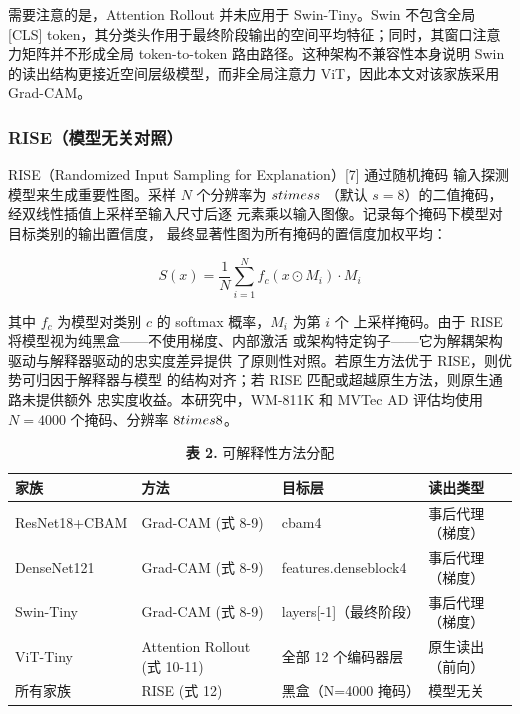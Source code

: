 \documentclass[11pt,a4paper]{article}
\begin{document}
需要注意的是，Attention Rollout 并未应用于 Swin-Tiny。Swin 不包含全局 [CLS] token，其分类头作用于最终阶段输出的空间平均特征；同时，其窗口注意力矩阵并不形成全局 token-to-token 路由路径。这种架构不兼容性本身说明 Swin 的读出结构更接近空间层级模型，而非全局注意力 ViT，因此本文对该家族采用 Grad-CAM。

\subsubsection{RISE（模型无关对照）}

RISE（Randomized Input Sampling for Explanation）[7] 通过随机掩码 输入探测模型来生成重要性图。采样 $N$ 个分辨率为 $s{\\times}s$ （默认 $s{=}8$）的二值掩码，经双线性插值上采样至输入尺寸后逐 元素乘以输入图像。记录每个掩码下模型对目标类别的输出置信度， 最终显著性图为所有掩码的置信度加权平均：

\begin{equation}
S(x) = \frac{1}{N} \sum_{i=1}^{N} f_c(x \odot M_i) \cdot M_i
\tag{12}
\end{equation}

其中 $f_c$ 为模型对类别 $c$ 的 softmax 概率，$M_i$ 为第 $i$ 个 上采样掩码。由于 RISE 将模型视为纯黑盒——不使用梯度、内部激活 或架构特定钩子——它为解耦架构驱动与解释器驱动的忠实度差异提供 了原则性对照。若原生方法优于 RISE，则优势可归因于解释器与模型 的结构对齐；若 RISE 匹配或超越原生方法，则原生通路未提供额外 忠实度收益。本研究中，WM-811K 和 MVTec AD 评估均使用 $N{=}4000$ 个掩码、分辨率 $8{\\times}8$。

\begin{table}[htbp]
\centering
\small
\caption{\textbf{表 2.} 可解释性方法分配}
\begin{tabular}{llll}
\toprule
家族 & 方法 & 目标层 & 读出类型 \\
\midrule
ResNet18+CBAM & Grad-CAM (式 8-9) & cbam4 & 事后代理（梯度） \\
DenseNet121 & Grad-CAM (式 8-9) & features.denseblock4 & 事后代理（梯度） \\
Swin-Tiny & Grad-CAM (式 8-9) & layers[-1]（最终阶段） & 事后代理（梯度） \\
ViT-Tiny & Attention Rollout (式 10-11) & 全部 12 个编码器层 & 原生读出（前向） \\
所有家族 & RISE (式 12) & 黑盒（N=4000 掩码） & 模型无关 \\
\bottomrule
\end{tabular}
\end{table}
\end{document}
